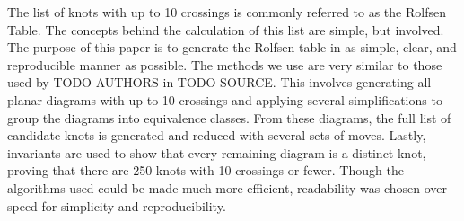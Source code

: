 
\theorems

\begin{paperabs}
The list of knots with up to 10 crossings is commonly referred to as the Rolfsen
Table.
The concepts behind the calculation of this list are simple, but involved.
The purpose of this paper is to generate the Rolfsen table in as simple, clear,
and reproducible manner as possible.
The methods we use are very similar to those used by TODO AUTHORS in TODO
SOURCE.
This involves generating all planar diagrams with up to 10 crossings and
applying several simplifications to group the diagrams into equivalence classes.
From these diagrams, the full list of candidate knots is generated and reduced
with several sets of moves.
Lastly, invariants are used to show that every remaining diagram is a distinct
knot, proving that there are 250 knots with 10 crossings or fewer.
Though the algorithms used could be made much more efficient, readability was
chosen over speed for simplicity and reproducibility.
\end{paperabs}
